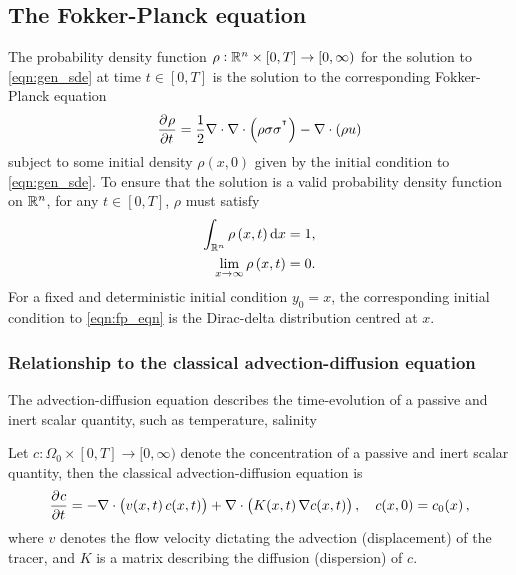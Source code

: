 \subsection{The Fokker-Planck equation}\label{sec:fp_eqn}
The probability density function \(\rho: \mathbb{R}^n \times [0,T] \to [0,\infty)\) for the solution to \cref{eqn:gen_sde} at time \(t \in [0,T]\) is the solution to the corresponding Fokker-Planck equation \citep{Risken_2012_FokkerPlanckEquationMethods}
\begin{equation}
	\dpd{\rho}{t} = \frac12\nabla\cdot\nabla\cdot\left(\rho\sigma\sigma^{\T}\right) - \nabla\cdot\left(\rho u\right)
	\label{eqn:fp_eqn}
\end{equation}
subject to some initial density \(\rho\left(x,0\right)\) given by the initial condition to \cref{eqn:gen_sde}.
To ensure that the solution is a valid probability density function on \(\mathbb{R}^n\), for any \(t \in [0,T]\), \(\rho\) must satisfy
\begin{subequations}\label{eqn:fp_valid_pdf}
	\begin{align}
		\int_{\R^n}{\rho\left(x, t\right)\dif x} = 1, \label{eqn:fp_valid_pdf_norm} \\
		\lim_{x \to \infty}\rho\left(x,t\right) = 0. \label{eqn:fp_valid_pdf_limit}
	\end{align}
\end{subequations}
For a fixed and deterministic initial condition \(y_0 = x\), the corresponding initial condition to \cref{eqn:fp_eqn} is the Dirac-delta distribution centred at \(x\).


\subsubsection{Relationship to the classical advection-diffusion equation}
The advection-diffusion equation describes the time-evolution of a passive and inert scalar quantity, such as temperature, salinity

\citep{Visser_2008_LagrangianModellingPlankton}

Let \(c \colon \Omega_0 \times [0,T] \to [0, \infty)\) denote the concentration of a passive and inert scalar quantity, then the classical advection-diffusion equation is
\begin{equation}\label{eqn:advec_diff}
	\dpd{c}{t} = - \nabla\cdot \left(v\!\left(x,t\right)c\!\left(x,t\right)\right) + \nabla\cdot\left(K\!\left(x,t\right)\nabla c\!\left(x,t\right)\right), \quad c\!\left(x,0\right) = c_0\!\left(x\right),
\end{equation}
where \(v\) denotes the flow velocity dictating the advection (displacement) of the tracer, and \(K\) is a matrix describing the diffusion (dispersion) of \(c\).





